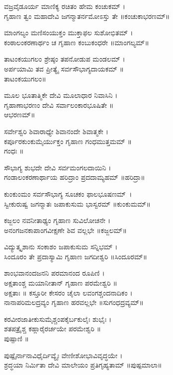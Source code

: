 ವಜ್ರವೈಡೂರ್ಯ ಮಾಣಿಕ್ಯ ರಚಿತಂ ಹೇಮ ಕಂಚುಕಮ್ ।\\
ಗೃಹಾಣ ತ್ವಂ ಮಹಾದೇವಿ ಜಗನ್ಮಾತರ್ನಮೋಽಸ್ತು ತೇ ॥ಕಂಚುಕಾಭರಣಮ್॥

ಮಾಂಗಲ್ಯಂ ಮಣಿಸಂಯುಕ್ತಂ ಮುಕ್ತಾಫಲ ಸುಶೋಭಿತಮ್ ।\\
ಕಂಠಾಲಂಕರಣಾರ್ಥಂ ಚ ಗೃಹಾಣ ಕಂಬುಕಂಧರೇ ॥ಮಾಂಗಲ್ಯಮ್॥

ತಾಟಂಕಯುಗಲಂ ಶ್ರೇಷ್ಠಂ ತಪನೋಡುಪ ಮಂಡಲಮ್ ।\\
ಅರ್ಪಯಾಮಿ ತವ ಪ್ರೀತ್ಯೈ ಸರ್ವಸೌಭಾಗ್ಯದಾಯಕಮ್ ॥\\ತಾಟಂಕಯುಗಲಂ॥

ಮೂಲ ಭೂತಾತ್ಮಿಕೇ ದೇವಿ ಮೂಲಾಧಾರ ನಿವಾಸಿನಿ ।\\
ಗೃಹಾಣಾಭರಣಂ ದೇವಿ ಸರ್ವಾಲಂಕಾರಭೂಷಿತೇ ॥\\
ಆಭರಣಮ್॥

ಸರ್ವೇಶ್ವರಿ ಶಿವಾರಾಧ್ಯೇ ಶಿವಾನಂದೇ ಶಿವಾತ್ಮಕೇ ।\\
ಕರ್ಪೂರಕುಂಕುಮೈರ್ಯುಕ್ತಂ ಗೃಹಾಣ ಗಂಧಮುತ್ತಮಮ್ ॥\\
ಗಂಧಃ ॥

ಸೌಭಾಗ್ಯ ಶುಭದೇ ದೇವಿ ಸರ್ವಮಂಗಲದಾಯಿನಿ ।\\
ಗಂಡಾಲಂಕರಣಾರ್ಥಾಯ ಹರಿದ್ರಾಂ ಪ್ರದದಾಮ್ಯಹಮ್ ॥ಹರಿದ್ರಾ॥

ಕುಂಕುಂಮಂ ಸರ್ವಸೌಭಾಗ್ಯ ಸೂಚಕಂ ಫಾಲಭೂಷಣಮ್~।\\
ಸ್ವೀಕುರುಷ್ವ ಜಗನ್ಮಾತಃ ಜಪಾಕುಸುಮ ಭಾಸ್ವರಮ್ ॥ಕುಂಕುಮಮ್॥

ಕಜ್ಜಲಂ ನವನೀತಾಢ್ಯಂ ಗೃಹಾಣ ಸುವಿಲೋಚನೇ ।\\
ಅನಂಗಜನಕಾಪಾಂಗವೀಕ್ಷಣೇ ಶಿವ ವಲ್ಲಭೇ ॥ಕಜ್ಜಲಮ್॥

ವಿದ್ಯುತ್ಕೃಶಾನು ಸಂಕಾಶಂ ಜಪಾಕುಸುಮ ಸನ್ನಿಭಮ್ ।\\
ಸಿಂದೂರಂ ತೇ ಪ್ರದಾಸ್ಯಾಮಿ ಗೃಹಾಣ ಜಗದೀಶ್ವರಿ ॥ಸಿಂದೂರಮ್॥

ಶಾಂಭವಾನಂದಜನನಿ ಪರಮಾನಂದ ರೂಪಿಣಿ ।\\
ಅಕ್ಷತಾಂಶ್ಚ ಮಯಾನೀತಾನ್ ಗೃಹಾಣ ಪರಮೇಶ್ವರಿ ॥\\
ಅಕ್ಷತಾಃ ॥
\newpage
ಕಸ್ತೂರೀ ಕೇಸರಂ ಚೈಲಾ ಲವಂಗಶ್ಚಂದನಾದಿಕಂ ।\\
ನಾನಾಪರಿಮಲದ್ರವ್ಯಂ ಗೃಹಾಣ ಹರವಲ್ಲಭೇ ॥ಸುಗಂಧದ್ರವ್ಯಮ್॥

ಕರವೀರಜಾತೀಕುಸುಮೈಶ್ಚಂಪಕೈರ್ಬಕುಲೈಃ ಶುಭೈಃ ।\\
ಶತಪತ್ರೈಶ್ಚ ಕಹ್ಲಾರೈರರ್ಚಯೇ ಪರಮೇಶ್ವರಿ ॥\\
ಪುಷ್ಪಾಣಿ ॥

ಪುಷ್ಪೈರ್ನಾನಾವಿಧೈರ್ದಿವ್ಯೈಃ ವೇಣೀಶೋಭಾವಿವೃದ್ಧಯೇ ।\\
ಶ್ರದ್ಧಯಾ ನಿರ್ಮಿತಾ ದೇವಿ ಮಾಲೇಯಂ ಪ್ರತಿಗೃಹ್ಯತಾಮ್ ॥ಪುಷ್ಪಮಾಲಾ॥ 


